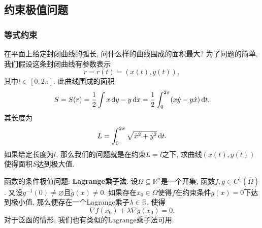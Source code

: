 \subsection{约束极值问题}

\subsubsection{等式约束}

\begin{example}[等周问题]
    在平面上给定封闭曲线的弧长, 问什么样的曲线围成的面积最大? 为了问题的简单, 我们假设这条封闭曲线有参数表示
    \begin{equation*}
        r = r(t) = (x(t), y(t)),
    \end{equation*}
    其中$t \in [0, 2\pi]$. 此曲线围成的面积 
    \begin{equation*}
        S = S(r)= \frac{1}{2}\int x \,{\rm d}y - y \,{\rm d}x = \frac{1}{2}\int_0^{2\pi}(x\dot y - y\dot x) \,{\rm d}t, 
    \end{equation*}
    其长度为 
    \begin{equation*}
        L = \int_0^{2\pi}\sqrt{\dot x^2 + \dot y^2} \,{\rm d}t.
    \end{equation*}
    如果给定长度为$l$, 那么我们的问题就是在约束$L = l$之下, 求曲线$(x(t), y(t))$使得面积$S$达到极大值.
\end{example}

函数的条件极值问题: \textbf{Lagrange乘子法}. 设$\Omega \subseteq \mathbb{R}^n$是一个开集, 函数$f, g \in C^1(\overline{\Omega})$.
又设$g^{-1}(0) \neq \varnothing$且$\dot g(x) \neq 0$. 如果存在$x_0 \in \Omega$使得$f$在约束条件$g(x) = 0$下达到极小值, 那么便存在一个Lagrange乘子$\lambda \in \mathbb{R}$, 使得 
\begin{equation*}
    \nabla f(x_0) + \lambda\nabla g(x_0) = 0.
\end{equation*}
对于泛函的情形, 我们也有类似的Lagrange乘子法可用.

